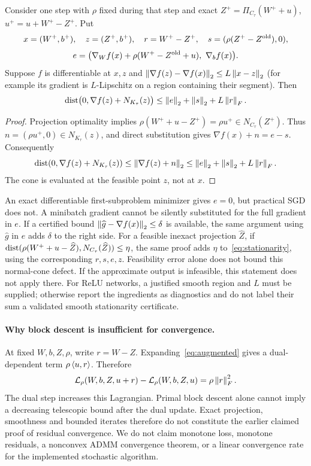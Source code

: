 \begin{proposition}\label{prop:stationarity}
Consider one step with $\rho$ fixed during that step and exact $Z^+=\Pi_{C_\tau}(W^++u)$, $u^+=u+W^+-Z^+$. Put
\[
 x=(W^+,b^+),\quad z=(Z^+,b^+),\quad
 r=W^+-Z^+,\quad s=(\rho(Z^+-Z^{\rm old}),0),
\]
\[
 e=\bigl(\nabla_W f(x)+\rho(W^+-Z^{\rm old}+u),\ \nabla_b f(x)\bigr).
\]
Suppose $f$ is differentiable at $x,z$ and
$\left\lVert\nabla f(z)-\nabla f(x)\right\rVert_2\le L\left\lVert x-z\right\rVert_2$
(for example its gradient is $L$-Lipschitz on a region containing their segment). Then
\begin{equation}\label{eq:stationarity}
 \operatorname{dist}\bigl(0,\nabla f(z)+N_{K_\tau}(z)\bigr)
 \le\left\lVert e\right\rVert_2+\left\lVert s\right\rVert_2+L\left\lVert r\right\rVert_F.
\end{equation}
\end{proposition}
\begin{proof}
Projection optimality implies $\rho(W^++u-Z^+)=\rho u^+\in N_{C_\tau}(Z^+)$. Thus $n=(\rho u^+,0)\in N_{K_\tau}(z)$, and direct substitution gives $\nabla f(x)+n=e-s$. Consequently
\[
 \operatorname{dist}(0,\nabla f(z)+N_{K_\tau}(z))
 \le\left\lVert\nabla f(z)+n\right\rVert_2
 \le\left\lVert e\right\rVert_2+\left\lVert s\right\rVert_2+L\left\lVert r\right\rVert_F.
\]
The cone is evaluated at the feasible point $z$, not at $x$.
\end{proof}
An exact differentiable first-subproblem minimizer gives $e=0$, but practical SGD does not. A minibatch gradient cannot be silently substituted for the full gradient in $e$. If a certified bound $\left\lVert\widehat g-\nabla f(x)\right\rVert_2\le\delta$ is available, the same argument using $\widehat g$ in $e$ adds $\delta$ to the right side. For a feasible inexact projection $\widehat Z$, if
$\operatorname{dist}(\rho(W^++u-\widehat Z),N_{C_\tau}(\widehat Z))\le\eta$, the same proof adds $\eta$ to~\eqref{eq:stationarity}, using the corresponding $r,s,e,z$. Feasibility error alone does not bound this normal-cone defect. If the approximate output is infeasible, this statement does not apply there. For ReLU networks, a justified smooth region and $L$ must be supplied; otherwise report the ingredients as diagnostics and do not label their sum a validated smooth stationarity certificate.

\paragraph{Why block descent is insufficient for convergence.}
At fixed $W,b,Z,\rho$, write $r=W-Z$. Expanding~\eqref{eq:augmented} gives a dual-dependent term $\rho\left\langle u,r\right\rangle$. Therefore
\begin{equation}\label{eq:dual_increase}
 \mathcal L_\rho(W,b,Z,u+r)-\mathcal L_\rho(W,b,Z,u)=\rho\left\lVert r\right\rVert_F^2.
\end{equation}
The dual step increases this Lagrangian. Primal block descent alone cannot imply a decreasing telescopic bound after the dual update. Exact projection, smoothness and bounded iterates therefore do not constitute the earlier claimed proof of residual convergence. We do not claim monotone loss, monotone residuals, a nonconvex ADMM convergence theorem, or a linear convergence rate for the implemented stochastic algorithm.

